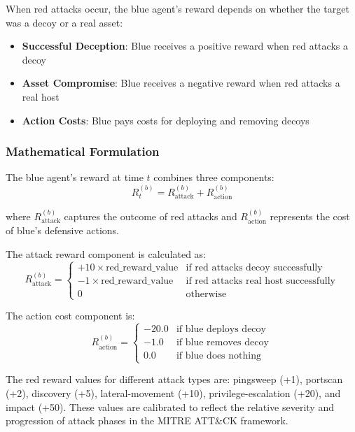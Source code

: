 \documentclass[12pt,oneside]{article}
\begin{document}
When red attacks occur, the blue agent's reward depends on whether the target was a decoy or a real asset:
\begin{itemize}
\item \textbf{Successful Deception}: Blue receives a positive reward when red attacks a decoy
\item \textbf{Asset Compromise}: Blue receives a negative reward when red attacks a real host
\item \textbf{Action Costs}: Blue pays costs for deploying and removing decoys
\end{itemize}

\subsubsection{Mathematical Formulation}

The blue agent's reward at time $t$ combines three components:
\begin{equation}
R_t^{(b)} = R_{\text{attack}}^{(b)} + R_{\text{action}}^{(b)}
\end{equation}

where $R_{\text{attack}}^{(b)}$ captures the outcome of red attacks and $R_{\text{action}}^{(b)}$ represents the cost of blue's defensive actions.

The attack reward component is calculated as:
\begin{equation}
R_{\text{attack}}^{(b)} = \begin{cases}
+10 \times \text{red\_reward\_value} & \text{if red attacks decoy successfully} \\
-1 \times \text{red\_reward\_value} & \text{if red attacks real host successfully} \\
0 & \text{otherwise}
\end{cases}
\end{equation}

The action cost component is:
\begin{equation}
R_{\text{action}}^{(b)} = \begin{cases}
-20.0 & \text{if blue deploys decoy} \\
-1.0 & \text{if blue removes decoy} \\
0.0 & \text{if blue does nothing}
\end{cases}
\end{equation}

The red reward values for different attack types are: pingsweep (+1), portscan (+2), discovery (+5), lateral-movement (+10), privilege-escalation (+20), and impact (+50). These values are calibrated to reflect the relative severity and progression of attack phases in the MITRE ATT\&CK framework.
\end{document}
